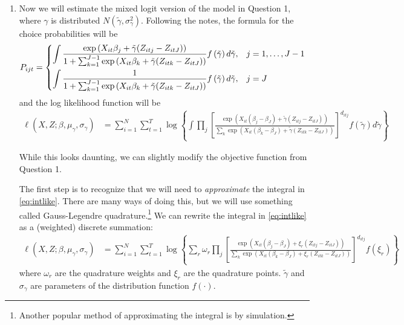 \documentclass[12pt,english]{article}
\begin{document}
\begin{enumerate}
\item Now we will estimate the mixed logit version of the model in Question 1, where $\gamma$ is distributed $N\left(\tilde{\gamma},\sigma^2_{\gamma}\right)$. Following the notes, the  formula for the choice probabilities will be
    \begin{align*}
        P_{ijt} &= \begin{dcases} \int\frac{\exp\left(X_{it}\beta_j + \tilde{\gamma}(Z_{itj}-Z_{itJ})\right)}{1+\sum_{k=1}^{J-1}\exp\left(X_{it}\beta_k + \tilde{\gamma}(Z_{itk}-Z_{itJ})\right)}f\left(\tilde{\gamma}\right)d\tilde{\gamma} ,& j=1,\ldots,J-1\\
         \int\frac{1}{1+\sum_{k=1}^{J-1}\exp\left(X_{it}\beta_k + \tilde{\gamma}(Z_{itk}-Z_{itJ})\right)}f\left(\tilde{\gamma}\right)d\tilde{\gamma} ,& j=J
         \end{dcases}
    \end{align*}
and the log likelihood function will be
\begin{align}
\label{eq:intlike}
\ell\left(X,Z;\beta,\mu_{\gamma},\sigma_{\gamma}\right)&=\sum_{i=1}^N\sum_{t=1}^T \log\left\{\int\prod_{j}\left[\frac{\exp\left(X_{it}\left(\beta_{j}-\beta_{J}\right)+\tilde{\gamma}\left(Z_{itj}-Z_{itJ}\right)\right)}{\sum_k \exp\left(X_{it}\left(\beta_{k}-\beta_{J}\right)+\tilde{\gamma}\left(Z_{itk}-Z_{itJ}\right)\right)}\right]^{d_{itj}}f\left(\tilde{\gamma}\right)d\tilde{\gamma}\right\}
\end{align}

While this looks daunting, we can slightly modify the objective function from Question 1. 

The first step is to recognize that we will need to \textit{approximate} the integral in \eqref{eq:intlike}. There are many ways of doing this, but we will use something called Gauss-Legendre quadrature.\footnote{Another popular method of approximating the integral is by simulation.} We can rewrite the integral in \eqref{eq:intlike} as a (weighted) discrete summation:
\begin{align}
\label{eq:quadlike}
\ell\left(X,Z;\beta,\mu_{\gamma},\sigma_{\gamma}\right)&=\sum_{i=1}^N\sum_{t=1}^T \log\left\{\sum_{r}\omega_{r}\prod_{j}\left[\frac{\exp\left(X_{it}\left(\beta_{j}-\beta_{J}\right)+\xi_r\left(Z_{itj}-Z_{itJ}\right)\right)}{\sum_k \exp\left(X_{it}\left(\beta_{k}-\beta_{J}\right)+\xi_r\left(Z_{itk}-Z_{itJ}\right)\right)}\right]^{d_{itj}}f\left(\xi_r\right)\right\}
\end{align}
where $\omega_r$ are the quadrature weights and $\xi_r$ are the quadrature points. $\tilde{\gamma}$ and $\sigma_{\gamma}$ are parameters of the distribution function $f\left(\cdot\right)$.


\end{enumerate}
\end{document}
